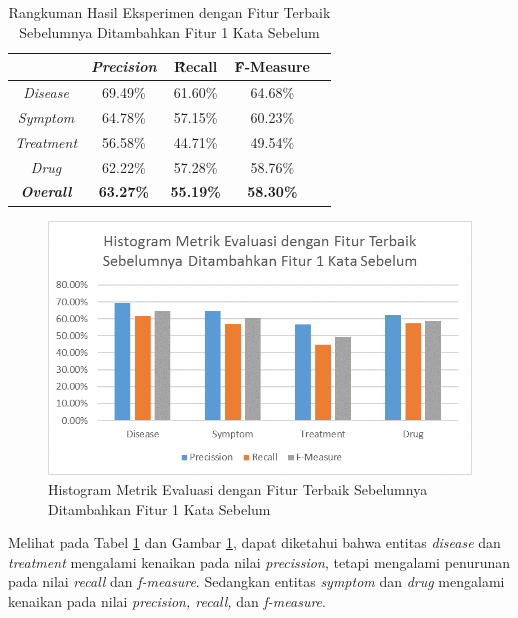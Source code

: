 	\begin{table}
		\centering
		\caption{Rangkuman Hasil Eksperimen dengan Fitur Terbaik Sebelumnya Ditambahkan Fitur 1 Kata Sebelum}
		\begin{tabular}{|c|c|c|c|c|}
			\hline
		                          & \textit{Precision} & \f{\f{Recall}} & \f{\f{F-Measure}} \\ \hline
			\textit{Disease}      & 69.49\%             & 61.60\%        & 64.68\%           \\ \hline
			\textit{Symptom}      & 64.78\%             & 57.15\%        & 60.23\%           \\ \hline
			\textit{Treatment}    & 56.58\%             & 44.71\%        & 49.54\%           \\ \hline
			\textit{Drug}		  & 62.22\%             & 57.28\%        & 58.76\%           \\ \hline
			\textit{\textbf{Overall}}&\textbf{63.27\%}  & \textbf{55.19\%}& \textbf{58.30\%} \\ \hline
		\end{tabular}
		\label{table:owndict7}
	\end{table}
	
	\begin{figure}
		\centering
		\includegraphics[width=0.85\linewidth]{images/histogram7}
		\caption{Histogram Metrik Evaluasi dengan Fitur Terbaik Sebelumnya Ditambahkan Fitur 1 Kata Sebelum}
		\label{fig:owndict7}
	\end{figure}
	
	Melihat pada Tabel \ref{table:owndict7} dan Gambar \ref{fig:owndict7}, dapat diketahui bahwa entitas \textit{disease} dan \textit{treatment} mengalami kenaikan pada nilai \textit{precission}, tetapi mengalami penurunan pada nilai \textit{recall} dan \textit{f-measure}. Sedangkan entitas \textit{symptom} dan \textit{drug} mengalami kenaikan pada nilai \textit{precision, recall,} dan \textit{f-measure}.
	
